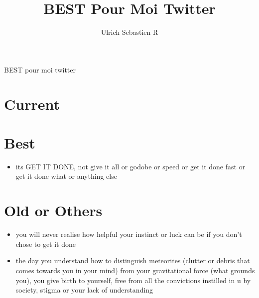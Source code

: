 \documentclass{article}
\author {Ulrich Sebastien R}
\title {\Large{\textbf{BEST Pour Moi Twitter}}}
\begin{document}
\maketitle    

BEST pour moi twitter

\section{Current}

\section{Best}

\begin{itemize}

\item its GET IT DONE, not give it all or godobe or speed or get it done fast or get it done what or anything else


\end{itemize}

\section{Old or Others}
\begin{itemize}
\item you will never realise how helpful your instinct or luck can be if you don't chose to get it done
\item the day you understand how to distinguish meteorites (clutter or debris that comes towards you in your mind) from your gravitational force (what grounds you), you give birth to yourself, free from all the convictions instilled in u by society, stigma or your lack of understanding
\end{itemize}
\end{document}

